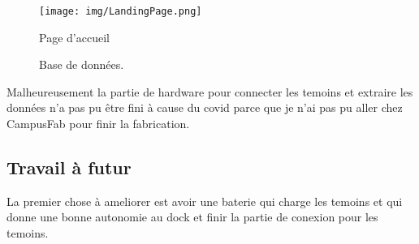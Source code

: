 \documentclass[12pt]{article}
\begin{document}
\begin{figure}[!htb]
	\centering
	\texttt{[image: img/LandingPage.png]}
	\caption{Page d'accueil}
	\label{img:gui:landing-page}
\end{figure}

\begin{figure}[!htb]
	\centering
	\caption{Base de donn\'ees.}
	\label{img:gui_all}
\end{figure}

\begin{par}
	Malheureusement la partie de hardware pour connecter
	les temoins et extraire les données n'a pas pu être
	fini à cause du covid parce que je n'ai pas pu aller
	chez CampusFab pour finir la fabrication.
\end{par}

\subsection*{Travail \`a futur}
\begin{par}
	La premier chose à ameliorer est avoir une baterie qui charge
	les temoins et qui donne une bonne autonomie au dock et finir la
	partie de conexion pour les temoins.
\end{par}
\end{document}
